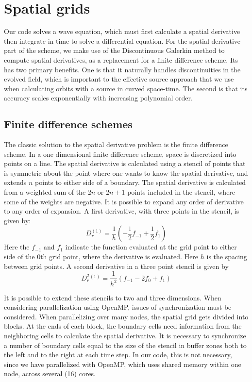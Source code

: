 \section{Spatial grids}
Our code solves a wave equation, which must first calculate a spatial derivative then integrate in time to solve a differential equation. For the spatial derivative part of the scheme, we make use of the Discontinuous Galerkin method to compute spatial derivatives, as a replacement for a finite difference scheme. Its has two primary benefits. One is that it naturally handles discontinuities in the evolved field, which is important to the effective source approach that we use when calculating orbits with a source in curved space-time. The second is that its accuracy scales exponentially with increasing polynomial order. 


\subsection{Finite difference schemes}
The classic solution to the spatial derivative problem is the finite difference scheme. In a one dimensional finite difference scheme, space is discretized into points on a line. The spatial derivative is calculated using a stencil of points that is symmetric about the point where one wants to know the spatial derivative, and extends $n$ points to either side of a boundary. The spatial derivative is calculated from a weighted sum of the $2n$ or $2n+1$ points included in the stencil, where some of the weights are negative. It is possible to expand any order of derivative to any order of expansion. A first derivative, with three points in the stencil, is given by:
\begin{equation}
  D_r^{(1)}=\frac{1}{h}(-\frac{1}{2}f_{-1}+\frac{1}{2}f_1)
\end{equation}
Here the $f_{-1}$ and $f_1$ indicate the function evaluated at the grid point to either side of the $0$th grid point, where the derivative is evaluated. Here $h$ is the spacing between grid points. A second derivative in a three point stencil is given by 
\begin{equation}
  D^2_r^(1)=\frac{1}{h^2}(f_{-1}-2f_0+f_1)
\end{equation}

It is possible to extend these stencils to two and three dimensions. When considering parallelization using OpenMP, issues of synchronization must be considered. When parallelizing over many nodes, the spatial grid gets divided into blocks. At the ends of each block, the boundary cells need information from the neighboring cells to calculate the spatial derivative. It is necessary to synchronize a number of boundary cells equal to the size of the stencil in buffer zones both to the left and to the right at each time step. In our code, this is not necessary, since we have parallelized with OpenMP, which uses shared memory within one node, across several (16) cores.

